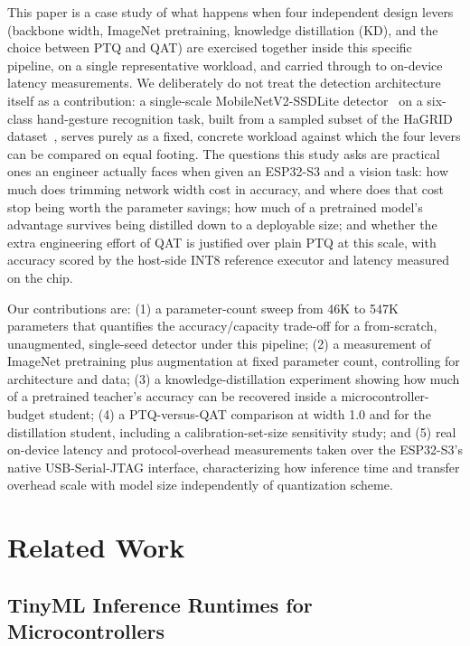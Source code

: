 \documentclass[conference]{IEEEtran}
\begin{document}
	This paper is a case study of what happens when four independent design levers (backbone
	width, ImageNet pretraining, knowledge distillation (KD), and the choice between PTQ and QAT)
	are exercised together inside this specific pipeline, on a single representative workload, and
	carried through to on-device latency measurements. We deliberately do not treat the detection
	architecture itself as a contribution: a single-scale MobileNetV2-SSDLite
	detector~\cite{sandler2018mobilenetv2,liu2016ssd} on a six-class hand-gesture recognition task,
	built from a sampled subset of the HaGRID dataset~\cite{kapitanov2024hagrid}, serves purely as a
	fixed, concrete workload against which the four levers can be compared on equal footing. The
	questions this study asks are practical ones an engineer actually faces when given an ESP32-S3
	and a vision task: how much does trimming network width cost in accuracy, and where does that
	cost stop being worth the parameter savings; how much of a pretrained model's advantage
	survives being distilled down to a deployable size; and whether the extra engineering effort of
	QAT is justified over plain PTQ at this scale, with accuracy scored by the host-side INT8 reference
	executor and latency measured on the chip.
	
	Our contributions are: (1) a parameter-count sweep from 46K to 547K parameters that
	quantifies the accuracy/capacity trade-off for a from-scratch, unaugmented, single-seed detector under this pipeline;
	(2) a measurement of ImageNet pretraining plus augmentation at fixed parameter count,
	controlling for architecture and data; (3) a knowledge-distillation experiment showing how
	much of a pretrained teacher's accuracy can be recovered inside a microcontroller-budget
	student; (4) a PTQ-versus-QAT comparison at width 1.0 and for the distillation student, including a
	calibration-set-size sensitivity study; and (5) real on-device latency and protocol-overhead
	measurements taken over the ESP32-S3's native USB-Serial-JTAG interface, characterizing how
	inference time and transfer overhead scale with model size independently of quantization
	scheme.
	
	\section{Related Work}
	
	\subsection{TinyML Inference Runtimes for Microcontrollers}
	
\end{document}
